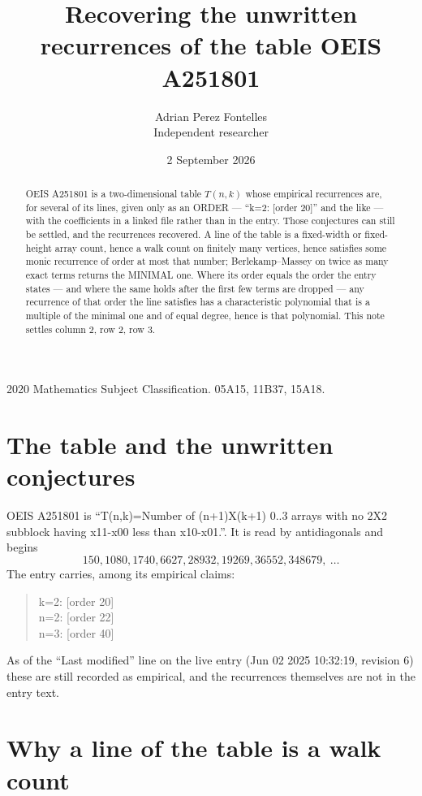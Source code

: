 \documentclass[11pt,a4paper]{article}
\title{Recovering the unwritten recurrences of the table OEIS A251801}
\author{Adrian Perez Fontelles\\ \small Independent researcher}
\date{2 September 2026}
\theoremstyle{plain}
\theoremstyle{definition}
\begin{document}
\maketitle

\begin{abstract}
OEIS A251801 is a two-dimensional table $T(n,k)$ whose empirical recurrences are, for several of
its lines, given only as an ORDER --- ``k=2: [order 20]'' and the like --- with the
coefficients in a linked file rather than in the entry. Those conjectures can still be settled,
and the recurrences recovered. A line of the table is a fixed-width or fixed-height array
count, hence a walk count on finitely many vertices, hence satisfies some monic recurrence of
order at most that number; Berlekamp--Massey on twice as many exact terms returns the MINIMAL
one. Where its order equals the order the entry states --- and where the same holds after the
first few terms are dropped --- any recurrence of that order the line satisfies has a
characteristic polynomial that is a multiple of the minimal one and of equal degree, hence is
that polynomial. This note settles column 2, row 2, row 3.
\end{abstract}

\noindent\small 2020 Mathematics Subject Classification. 05A15, 11B37, 15A18.\normalsize

\section{The table and the unwritten conjectures}

OEIS A251801 is ``T(n,k)=Number of (n+1)X(k+1) 0..3 arrays with no 2X2 subblock having x11-x00 less than x10-x01.''. It is read by antidiagonals and begins
\[
150, 1080, 1740, 6627, 28932, 19269, 36552, 348679,\ \dots
\]
The entry carries, among its empirical claims:
\begin{quote}\small
k=2: [order 20]\\
n=2: [order 22]\\
n=3: [order 40]
\end{quote}
As of the ``Last modified'' line on the live entry (Jun 02 2025 10:32:19, revision 6) these are still
recorded as empirical, and the recurrences themselves are not in the entry text.

\section{Why a line of the table is a walk count}
\end{document}
